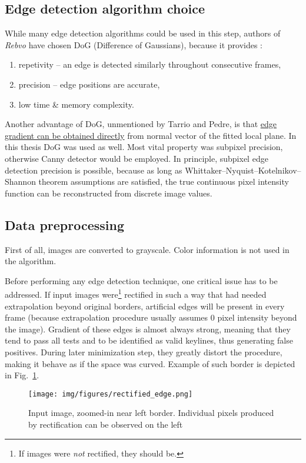 \subsection{Edge detection algorithm choice}
While many edge detection algorithms could be used in this step, authors of \textit{Rebvo} have chosen DoG (Difference of Gaussians), because it provides \cite{jose2015realtime}:
\begin{enumerate}
	\item repetivity -- an edge is detected similarly throughout consecutive frames,
	\item precision -- edge positions are accurate,
	\item low time \& memory complexity.
\end{enumerate}

Another advantage of DoG, unmentioned by Tarrio and Pedre, is that \underline{edge gradient can be obtained directly} from normal vector of the fitted local plane. In this thesis DoG was used as well. Most vital property was subpixel precision, otherwise Canny detector \cite{canny} would be employed. In principle, subpixel edge detection precision is possible, because as long as Whittaker–Nyquist–Kotelnikov–Shannon theorem assumptions are satisfied, the true continuous pixel intensity function can be reconstructed from discrete image values.

\subsection{Data preprocessing}

First of all, images are converted to grayscale. Color information is not used in the algorithm.

Before performing any edge detection technique, one critical issue has to be addressed. If input images were\footnote{If images were \textit{not} rectified, they should be.} rectified in such a way that had needed extrapolation beyond original borders, artificial edges will be present in every frame (because extrapolation procedure usually assumes 0 pixel intensity beyond the image). Gradient of these edges is almost always strong, meaning that they tend to pass all tests and to be identified as valid keylines, thus generating false positives. During later minimization step, they greatly distort the procedure, making it behave as if the space was curved. Example of such border is depicted in Fig.~\ref{fig:rectifcy_border}.

\begin{figure}[ht]
	\centering\texttt{[image: img/figures/rectified\_edge.png]}
	\caption{ Input image, zoomed-in near left border. Individual pixels produced by rectification can be observed on the left }
	\label{fig:rectifcy_border}
\end{figure}

